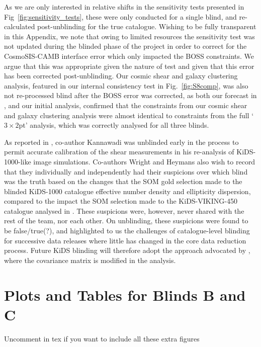 \begin{appendix}
As we are only interested in relative shifts in the sensitivity tests presented in Fig~\ref{fig:sensitivity_tests}, these were only conducted for a single blind, and re-calculated post-unblinding for the true catalogue.  Wishing to be fully transparent in this Appendix, we note that owing to limited resources the sensitivity test was not updated during the blinded phase of the project in order to correct for the {\sc CosmoSIS-CAMB} interface error which only impacted the BOSS constraints.   We argue that this was appropriate given the nature of test and given that this error has been corrected post-unblinding.    Our cosmic shear and galaxy clustering analysis, featured in our internal consistency test in Fig.~\ref{fig:S8comp}, was also not re-processed blind after the BOSS error was corrected, as both our forecast in \citet{joachimi/etal:inprep}, and our initial analysis, confirmed that the constraints from our cosmic shear and galaxy clustering analysis were almost identical to constraints from the full `$3\times2$pt' analysis, which was correctly analysed for all three blinds.

As reported in \citet{giblin/etal:inprep}, co-author Kannawadi was unblinded early in the process to permit accurate calibration of the shear measurements in his re-analysis of KiDS-1000-like image simulations.   Co-authors Wright and Heymans also wish to record that they individually and independently had their suspicions over which blind was the truth based on the changes that the SOM gold selection made to the blinded KiDS-1000 catalogue effective number density and ellipticity dispersion, compared to the impact the SOM selection made to the KiDS-VIKING-450 catalogue analysed in \citet{wright/etal:2020b}.  These suspicions were, however, never shared with the rest of the team, nor each other.   On unblinding, these suspicions were found to be false/true(?),  and highlighted to us the challenges of catalogue-level blinding for successive data releases where little has changed in the core data reduction process.   Future KiDS blinding will therefore adopt the approach advocated by \citet{sellentin:2020}, where the covariance matrix is modified in the analysis.





\section{Plots and Tables for Blinds B and C}
Uncomment in tex if you want to include all these extra figures
%
%
%



\end{appendix}